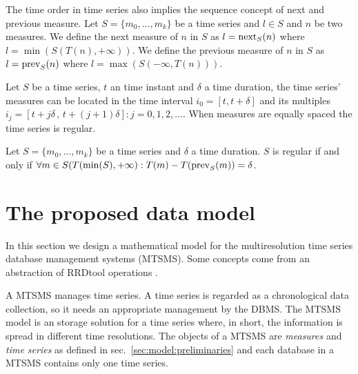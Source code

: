 The time order in time series also implies the sequence concept of
next and previous measure.  Let $S=\{m_0, \ldots, m_k\}$ be a time
series and $l\in S$ and $n$ be two measures. We define the next
measure of $n$ in $S$ as $l=\operatorname*{next}_S(n)$ where $l =
\min(S(T(n),+\infty))$. We define the previous measure of $n$ in $S$
as $l=\operatorname*{prev}_S(n)$ where $l = \max(S(-\infty,T(n)))$.



Let $S$ be a time series, $t$ an time instant and
$\delta$ a time duration, the time series' measures can be located in
the time interval $i_0=[t,t+\delta]$ and its multiples $i_j=[t+j\delta
\,,\, t+(j+1)\delta]: j=0,1,2,\ldots$. 
When  measures are
equally spaced the time series is regular.
\begin{definition}
  Let $S=\{m_0,\ldots,m_k\}$ be a time series and $\delta$ a time
  duration. $S$ is regular if and only if $\forall m \in
  S(T(\min(S),+\infty):T(m) - T(\operatorname*{prev}_S(m)) =
  \delta$. %
\end{definition}



\section{The proposed data model}
\label{sec:MTSMS}

In this section we design a mathematical model for the multiresolution
time series database management systems (MTSMS). Some concepts come
from an abstraction of RRDtool operations \cite{rrdtool}.

A MTSMS manages time series. A time series is regarded as a
chronological data collection, so it needs an appropriate management
by the DBMS.  The MTSMS model is an storage solution for a time series
where, in short, the information is spread in different time
resolutions.  The objects of a MTSMS are \emph{measures} and
\emph{time series} as defined in sec.~\ref{sec:model:preliminaries} and
each database in a MTSMS contains only one time series.


